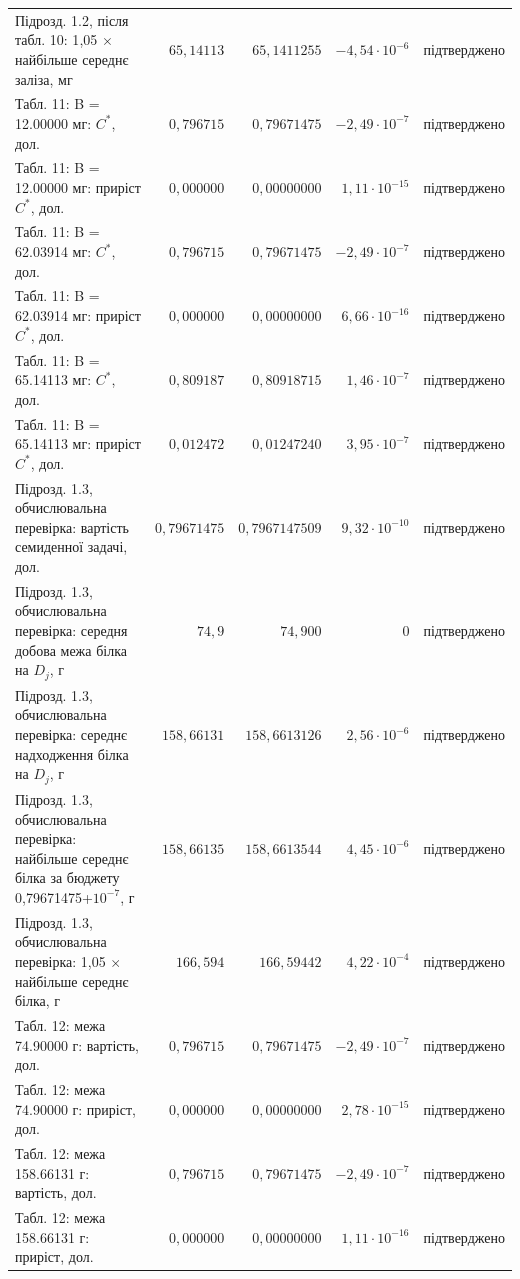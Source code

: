 {\begin{longtable}{>{\raggedright}p{4.3cm}rrr>{\raggedright\arraybackslash}p{2.3cm}}
Підрозд. 1.2, після табл. 10: 1{,}05 $\times$ найбільше середнє заліза, мг & $65{,}14113$ & $65{,}1411255$ & $-4{,}54\cdot10^{-6}$ & підтверджено \\
Табл. 11: B = 12.00000 мг: $C^*$, дол. & $0{,}796715$ & $0{,}79671475$ & $-2{,}49\cdot10^{-7}$ & підтверджено \\
Табл. 11: B = 12.00000 мг: приріст $C^*$, дол. & $0{,}000000$ & $0{,}00000000$ & $1{,}11\cdot10^{-15}$ & підтверджено \\
Табл. 11: B = 62.03914 мг: $C^*$, дол. & $0{,}796715$ & $0{,}79671475$ & $-2{,}49\cdot10^{-7}$ & підтверджено \\
Табл. 11: B = 62.03914 мг: приріст $C^*$, дол. & $0{,}000000$ & $0{,}00000000$ & $6{,}66\cdot10^{-16}$ & підтверджено \\
Табл. 11: B = 65.14113 мг: $C^*$, дол. & $0{,}809187$ & $0{,}80918715$ & $1{,}46\cdot10^{-7}$ & підтверджено \\
Табл. 11: B = 65.14113 мг: приріст $C^*$, дол. & $0{,}012472$ & $0{,}01247240$ & $3{,}95\cdot10^{-7}$ & підтверджено \\
Підрозд. 1.3, обчислювальна перевірка: вартість семиденної задачі, дол. & $0{,}79671475$ & $0{,}7967147509$ & $9{,}32\cdot10^{-10}$ & підтверджено \\
Підрозд. 1.3, обчислювальна перевірка: середня добова межа білка на $D_j$, г & $74{,}9$ & $74{,}900$ & $0$ & підтверджено \\
Підрозд. 1.3, обчислювальна перевірка: середнє надходження білка на $D_j$, г & $158{,}66131$ & $158{,}6613126$ & $2{,}56\cdot10^{-6}$ & підтверджено \\
Підрозд. 1.3, обчислювальна перевірка: найбільше середнє білка за бюджету 0{,}79671475+$10^{-7}$, г & $158{,}66135$ & $158{,}6613544$ & $4{,}45\cdot10^{-6}$ & підтверджено \\
Підрозд. 1.3, обчислювальна перевірка: 1{,}05 $\times$ найбільше середнє білка, г & $166{,}594$ & $166{,}59442$ & $4{,}22\cdot10^{-4}$ & підтверджено \\
Табл. 12: межа 74.90000 г: вартість, дол. & $0{,}796715$ & $0{,}79671475$ & $-2{,}49\cdot10^{-7}$ & підтверджено \\
Табл. 12: межа 74.90000 г: приріст, дол. & $0{,}000000$ & $0{,}00000000$ & $2{,}78\cdot10^{-15}$ & підтверджено \\
Табл. 12: межа 158.66131 г: вартість, дол. & $0{,}796715$ & $0{,}79671475$ & $-2{,}49\cdot10^{-7}$ & підтверджено \\
Табл. 12: межа 158.66131 г: приріст, дол. & $0{,}000000$ & $0{,}00000000$ & $1{,}11\cdot10^{-16}$ & підтверджено \\

\end{longtable}}
